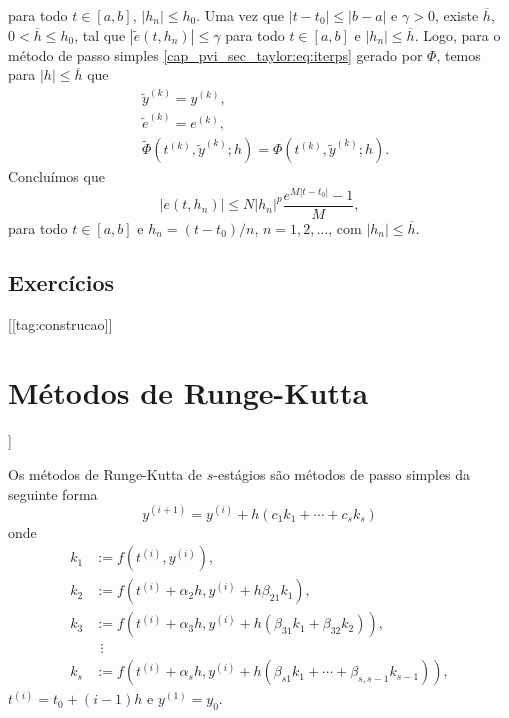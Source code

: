\begin{dem}
\begin{equation}
  \end{equation}
  para todo $t\in [a, b]$, $|h_n|\leq h_0$. Uma vez que $|t-t_0|\leq |b-a|$ e $\gamma >0$, existe $\overline{h}$, $0<\overline{h}\leq h_0$, tal que $\left|\tilde{e}\left(t, h_n\right)\right| \leq \gamma$ para todo $t\in [a, b]$ e $|h_n|\leq \overline{h}$. Logo, para o método de passo simples \eqref{cap_pvi_sec_taylor:eq:iterps} gerado por $\Phi$, temos para $|h|\leq\overline{h}$ que
  \begin{align}
    &\tilde{y}^{(k)} = y^{(k)},\\
    &\tilde{e}^{(k)} = e^{(k)},\\
    &\tilde{\Phi}\left(t^{(k)}, \tilde{y}^{(k)}; h\right) = \Phi\left(t^{(k)}, \tilde{y}^{(k)}; h\right).
  \end{align}
  Concluímos que
  \begin{equation}
    \left|e\left(t, h_n\right)\right| \leq N|h_n|^p\frac{e^{M|t-t_0|}-1}{M},
  \end{equation}
  para todo $t\in [a, b]$ e $h_n = (t-t_0)/n$, $n=1, 2, \ldots$, com $|h_n|\leq \overline{h}$.
\end{dem}

\subsection{Exercícios}

[[tag:construcao]]


\section{Métodos de Runge-Kutta}\label{cap_pvi_sec_RK}

\begin{flushleft}
  [[tag:revisar]]
\end{flushleft}

Os métodos de Runge-Kutta de $s$-estágios são métodos de passo simples da seguinte forma
\begin{equation}
  y^{(i+1)} = y^{(i)} + h(c_1k_1 + \cdots + c_sk_s)
\end{equation}
onde
\begin{align}
  k_1 &:= f(t^{(i)},y^{(i)}),\\
  k_2 &:= f(t^{(i)}+\alpha_2h,y^{(i)}+h\beta_{21}k_1),\\
  k_3 &:= f(t^{(i)}+\alpha_3h,y^{(i)}+h(\beta_{31}k_1+\beta_{32}k_2)),\\
      &~~\vdots\\
  k_s &:= f(t^{(i)}+\alpha_sh,y^{(i)}+h(\beta_{s1}k_1+\cdots+\beta_{s,s-1}k_{s-1})),
\end{align}
$t^{(i)}=t_0+(i-1)h$ e $y^{(1)}=y_0$.

